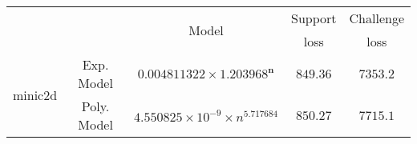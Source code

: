 \begin{tabular}{ccccc} 
\hline 
 &  & \multirow{2}{*}{Model} & Support & Challenge\tabularnewline 
 &  &  & loss  & loss\tabularnewline 
\hline 
\hline 
\multirow{2}{*}{minic2d} & Exp. Model & $\mathbf{0.004811322\times 1.203968^{n}}$ & $\mathbf{849.36}$ & $\mathbf{7353.2}$ \tabularnewline 
 & Poly. Model & $4.550825\times10^{-9}\times n^{5.717684}$ & $850.27$ & $7715.1$ \tabularnewline 
\hline 
\end{tabular} 


